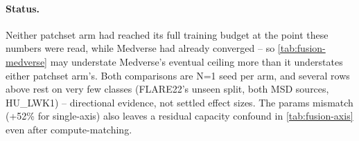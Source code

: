 \paragraph{Status.} Neither patchset arm had reached its full training budget at the point
these numbers were read, while Medverse had already converged -- so
\autoref{tab:fusion-medverse} may understate Medverse's eventual ceiling more than it
understates either patchset arm's. Both comparisons are N=1 seed per arm, and several rows
above rest on very few classes (FLARE22's unseen split, both MSD sources, HU\_LWK1) --
directional evidence, not settled effect sizes. The params mismatch (+52\% for single-axis)
also leaves a residual capacity confound in \autoref{tab:fusion-axis} even after
compute-matching.
